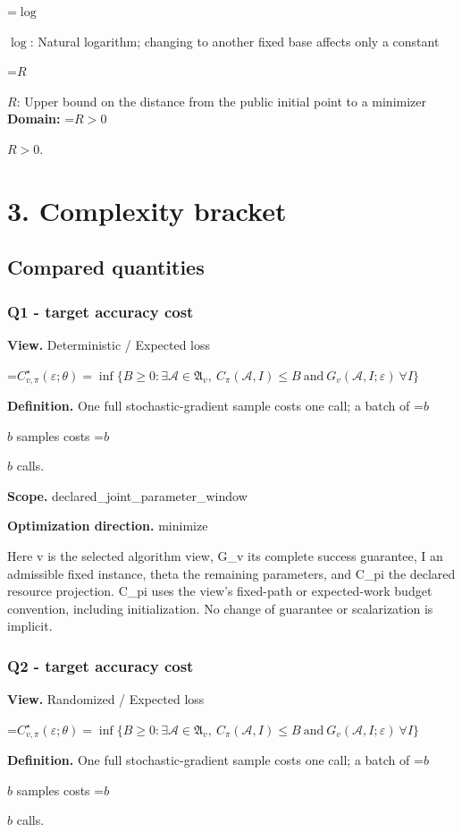 \documentclass[10pt,a4paper]{article}
\newcommand{\AtlasMath}[1]{\par\begingroup\centering\setbox0=\hbox{$\displaystyle #1$}\ifdim\wd0>1.4\linewidth\typeout{ATLAS WIDE FORMULA: \the\wd0}\fi\ifdim\wd0>\linewidth\resizebox{\linewidth}{!}{\box0}\else\box0\fi\par\endgroup}
\newcommand{\AtlasInlineMath}[1]{\begingroup\setbox0=\hbox{$#1$}\ifdim\wd0>.4\linewidth\endgroup\AtlasMath{#1}\else\endgroup$#1$\fi}
\begin{document}
\AtlasInlineMath{\log}: Natural logarithm; changing to another fixed base affects only a constant

\AtlasInlineMath{R}: Upper bound on the distance from the public initial point to a minimizer \textbf{Domain:} \AtlasInlineMath{R>0}.

\section{3. Complexity bracket}
\subsection{Compared quantities}
\subsubsection{Q1 - target accuracy cost}
\textbf{View.} Deterministic / Expected loss

\AtlasMath{C^\star_{v,\pi}(\varepsilon;\theta)=\inf\{B\ge0:\exists\mathcal A\in\mathfrak A_v,\ C_\pi(\mathcal A,I)\le B\ \text{and}\ G_v(\mathcal A,I;\varepsilon)\ \forall I\}}
\textbf{Definition.} One full stochastic-gradient sample costs one call; a batch of \AtlasInlineMath{b} samples costs \AtlasInlineMath{b} calls.

\textbf{Scope.} declared\_joint\_parameter\_window

\textbf{Optimization direction.} minimize

Here v is the selected algorithm view, G\_v its complete success guarantee, I an admissible fixed instance, theta the remaining parameters, and C\_pi the declared resource projection. C\_pi uses the view's fixed-path or expected-work budget convention, including initialization. No change of guarantee or scalarization is implicit.

\subsubsection{Q2 - target accuracy cost}
\textbf{View.} Randomized / Expected loss

\AtlasMath{C^\star_{v,\pi}(\varepsilon;\theta)=\inf\{B\ge0:\exists\mathcal A\in\mathfrak A_v,\ C_\pi(\mathcal A,I)\le B\ \text{and}\ G_v(\mathcal A,I;\varepsilon)\ \forall I\}}
\textbf{Definition.} One full stochastic-gradient sample costs one call; a batch of \AtlasInlineMath{b} samples costs \AtlasInlineMath{b} calls.
\end{document}
